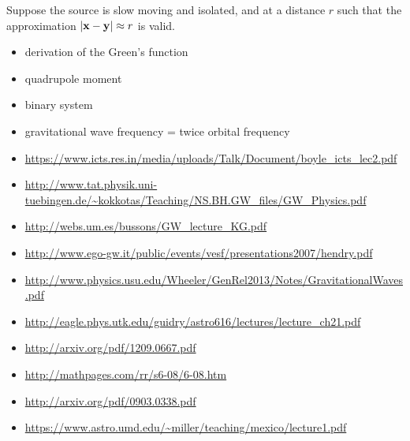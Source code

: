 Suppose the source is slow moving and isolated, and at a distance $r$ such that the approximation $|{\mathbf{x}} - {\mathbf{y}} | \approx r$ is valid. 

\begin{itemize}
\item derivation of the Green's function
\item quadrupole moment
\item binary system
\item gravitational wave frequency = twice orbital frequency
\item \url{https://www.icts.res.in/media/uploads/Talk/Document/boyle_icts_lec2.pdf} 
\item \url{http://www.tat.physik.uni-tuebingen.de/~kokkotas/Teaching/NS.BH.GW_files/GW_Physics.pdf}
\item \url{http://webs.um.es/bussons/GW_lecture_KG.pdf}
\item \url{http://www.ego-gw.it/public/events/vesf/presentations2007/hendry.pdf}
\item \url{http://www.physics.usu.edu/Wheeler/GenRel2013/Notes/GravitationalWaves.pdf}
\item \url{http://eagle.phys.utk.edu/guidry/astro616/lectures/lecture_ch21.pdf}
\item \url{http://arxiv.org/pdf/1209.0667.pdf}
\item \url{http://mathpages.com/rr/s6-08/6-08.htm}
\item \url{http://arxiv.org/pdf/0903.0338.pdf}
\item \url{https://www.astro.umd.edu/~miller/teaching/mexico/lecture1.pdf}
\end{itemize}


